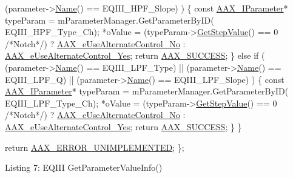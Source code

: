 \begin{DoxyCode}
             (parameter->\hyperlink{a00108_ae1dae8844a16492726cb6caac7e2e822}{Name}() == EQIII\_HPF\_Slope)     )
        \{
            \textcolor{keyword}{const} \hyperlink{a00108}{AAX\_IParameter}* typeParam = mParameterManager.GetParameterByID(
      EQIII\_HPF\_Type\_Ch);
             *oValue = (typeParam->\hyperlink{a00108_ad4fc7431439f53cc0253d191b19db00b}{GetStepValue}() == 0 \textcolor{comment}{/*Notch*/}) ? 
      \hyperlink{a00206_abbcc8b4e8207262a5dd9e32047a51a29a5cfea068cc7ea51becccc9d26955e443}{AAX\_eUseAlternateControl\_No} : 
      \hyperlink{a00206_abbcc8b4e8207262a5dd9e32047a51a29aa63097dc0b27e51411f30b06b2db26f1}{AAX\_eUseAlternateControl\_Yes};
            \textcolor{keywordflow}{return} \hyperlink{a00207_a5f8c7439f3a706c4f8315a9609811937aeddbd1bb67e3a66e6af54a4b4a7a57b3}{AAX\_SUCCESS};
        \}
        \textcolor{keywordflow}{else} \textcolor{keywordflow}{if} ( (parameter->\hyperlink{a00108_ae1dae8844a16492726cb6caac7e2e822}{Name}() == EQIII\_LPF\_Type) ||
                  (parameter->\hyperlink{a00108_ae1dae8844a16492726cb6caac7e2e822}{Name}() == EQIII\_LPF\_Q)    ||
                  (parameter->\hyperlink{a00108_ae1dae8844a16492726cb6caac7e2e822}{Name}() == EQIII\_LPF\_Slope)    )
        \{
            \textcolor{keyword}{const} \hyperlink{a00108}{AAX\_IParameter}* typeParam = mParameterManager.GetParameterByID(
      EQIII\_LPF\_Type\_Ch);
             *oValue = (typeParam->\hyperlink{a00108_ad4fc7431439f53cc0253d191b19db00b}{GetStepValue}() == 0 \textcolor{comment}{/*Notch*/}) ? 
      \hyperlink{a00206_abbcc8b4e8207262a5dd9e32047a51a29a5cfea068cc7ea51becccc9d26955e443}{AAX\_eUseAlternateControl\_No} : 
      \hyperlink{a00206_abbcc8b4e8207262a5dd9e32047a51a29aa63097dc0b27e51411f30b06b2db26f1}{AAX\_eUseAlternateControl\_Yes};
            \textcolor{keywordflow}{return} \hyperlink{a00207_a5f8c7439f3a706c4f8315a9609811937aeddbd1bb67e3a66e6af54a4b4a7a57b3}{AAX\_SUCCESS};
        \}
    \}

\textcolor{keywordflow}{return} \hyperlink{a00207_a5f8c7439f3a706c4f8315a9609811937a3b76994b32b97fcd56b19ef8032245df}{AAX\_ERROR\_UNIMPLEMENTED};
\};  
\end{DoxyCode}
  Listing 7\+: E\+Q\+I\+I\+I Get\+Parameter\+Value\+Info()

